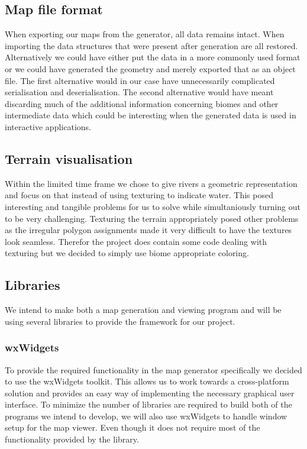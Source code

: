 
\subsection{Map file format}
When exporting our maps from the generator, all data remains intact. When importing the data structures that were present after generation are all restored. Alternatively we could have either put the data in a more commonly used format or we could have generated the geometry and merely exported that as an object file. The first alternative would in our case have unnecessarily complicated serialisation and deserialisation. The second alternative would have meant discarding much of the additional information concerning biomes and other intermediate data which could be interesting when the generated data is used in interactive applications.

\subsection{Terrain visualisation}
Within the limited time frame we chose to give rivers a geometric representation and focus on that instead of using texturing to indicate water. This posed interesting and tangible problems for us to solve while simultaniously turning out to be very challenging. Texturing the terrain appropriately posed other problems as the irregular polygon assignments made it very difficult to have the textures look seamless. Therefor the project does contain some code dealing with texturing but we decided to simply use biome appropriate coloring.

\subsection{Libraries}
We intend to make both a map generation and viewing program and will be using several libraries to provide the framework for our project.

\subsubsection{wxWidgets}
To provide the required functionality in the map generator specifically we decided to use the wxWidgets toolkit. This allows us to work towards a cross-platform solution and provides an easy way of implementing the necessary graphical user interface. To minimize the number of libraries are required to build both of the programs we intend to develop, we will also use wxWidgets to handle window setup for the map viewer. Even though it does not require most of the functionality provided by the library.

